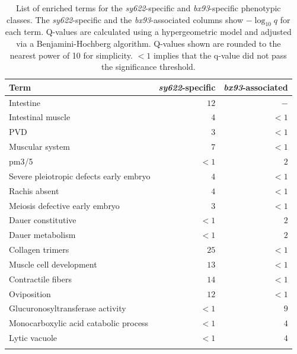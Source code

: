 \documentclass[10pt, onecolumn]{article}
\begin{document}
%
\begin{table}[tbhp]
  \centering
  \begin{tabular}{lrr}
    \toprule{}Term & \emph{sy622}-specific & \emph{bx93}-associated\\
    \midrule{}Intestine & $12$ & $-$\\
    Intestinal muscle & $4$ & $<1$\\
    PVD & $3$ & $<1$\\
    Muscular system & $7$ & $<1$\\
    pm3/5 & $<1$ & $2$\\
    Severe pleiotropic defects early embryo & $4$ & $<1$\\
    Rachis absent & $4$ & $<1$\\
    Meiosis defective early embryo & $3$ & $<1$\\
    Dauer constitutive & $<1$ &$2$\\
    Dauer metabolism  & $<1$ &$2$\\
    Collagen trimers  & $25$ & $<1$\\
    Muscle cell development & $13$ & $<1$\\
    Contractile fibers & $14$ & $<1$\\
    Oviposition & $12$ & $<1$\\
    Glucuronosyltransferase activity &$<1$ & $9$\\
    Monocarboxylic acid catabolic process &$<1$ & $4$\\
    Lytic vacuole & $<1$& $4$\\
    \bottomrule{}
  \end{tabular}
  \caption{
    List of enriched terms for the \emph{sy622}-specific and \emph{bx93}-specific
    phenotypic classes. The \emph{sy622}-specific and the \emph{bx93}-associated
    columns show $-\log_{10}{q}$ for each term. Q-values are calculated using a
    hypergeometric model and
    adjusted via a Benjamini-Hochberg algorithm. Q-values shown are rounded to
    the nearest power of 10 for simplicity. $<1$ implies that the q-value did not
    pass the significance threshold.
  }
\label{tab:enrich}
\end{table}
\end{document}
